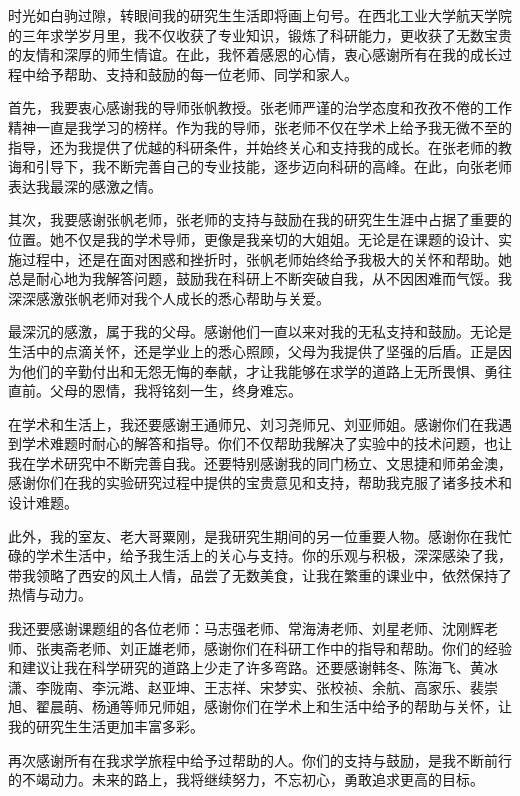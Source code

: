 \documentclass[lang=chs, degree=master, blindreview=false, winfonts=true]{yanputhesis}
\begin{document}
\begin{acknowledgements}                                    %
时光如白驹过隙，转眼间我的研究生生活即将画上句号。在西北工业大学航天学院的三年求学岁月里，我不仅收获了专业知识，锻炼了科研能力，更收获了无数宝贵的友情和深厚的师生情谊。在此，我怀着感恩的心情，衷心感谢所有在我的成长过程中给予帮助、支持和鼓励的每一位老师、同学和家人。

首先，我要衷心感谢我的导师张帆教授。张老师严谨的治学态度和孜孜不倦的工作精神一直是我学习的榜样。作为我的导师，张老师不仅在学术上给予我无微不至的指导，还为我提供了优越的科研条件，并始终关心和支持我的成长。在张老师的教诲和引导下，我不断完善自己的专业技能，逐步迈向科研的高峰。在此，向张老师表达我最深的感激之情。

其次，我要感谢张帆老师，张老师的支持与鼓励在我的研究生生涯中占据了重要的位置。她不仅是我的学术导师，更像是我亲切的大姐姐。无论是在课题的设计、实施过程中，还是在面对困惑和挫折时，张帆老师始终给予我极大的关怀和帮助。她总是耐心地为我解答问题，鼓励我在科研上不断突破自我，从不因困难而气馁。我深深感激张帆老师对我个人成长的悉心帮助与关爱。


最深沉的感激，属于我的父母。感谢他们一直以来对我的无私支持和鼓励。无论是生活中的点滴关怀，还是学业上的悉心照顾，父母为我提供了坚强的后盾。正是因为他们的辛勤付出和无怨无悔的奉献，才让我能够在求学的道路上无所畏惧、勇往直前。父母的恩情，我将铭刻一生，终身难忘。

在学术和生活上，我还要感谢王通师兄、刘习尧师兄、刘亚师姐。感谢你们在我遇到学术难题时耐心的解答和指导。你们不仅帮助我解决了实验中的技术问题，也让我在学术研究中不断完善自我。还要特别感谢我的同门杨立、文思捷和师弟金澳，感谢你们在我的实验研究过程中提供的宝贵意见和支持，帮助我克服了诸多技术和设计难题。

此外，我的室友、老大哥粟刚，是我研究生期间的另一位重要人物。感谢你在我忙碌的学术生活中，给予我生活上的关心与支持。你的乐观与积极，深深感染了我，带我领略了西安的风土人情，品尝了无数美食，让我在繁重的课业中，依然保持了热情与动力。

我还要感谢课题组的各位老师：马志强老师、常海涛老师、刘星老师、沈刚辉老师、张夷斋老师、刘正雄老师，感谢你们在科研工作中的指导和帮助。你们的经验和建议让我在科学研究的道路上少走了许多弯路。还要感谢韩冬、陈海飞、黄冰潇、李陇南、李沅澔、赵亚坤、王志祥、宋梦实、张校祯、余航、高家乐、裴崇旭、翟晨萌、杨通等师兄师姐，感谢你们在学术上和生活中给予的帮助与关怀，让我的研究生生活更加丰富多彩。

再次感谢所有在我求学旅程中给予过帮助的人。你们的支持与鼓励，是我不断前行的不竭动力。未来的路上，我将继续努力，不忘初心，勇敢追求更高的目标。
\end{acknowledgements}                                      %
\end{document}

